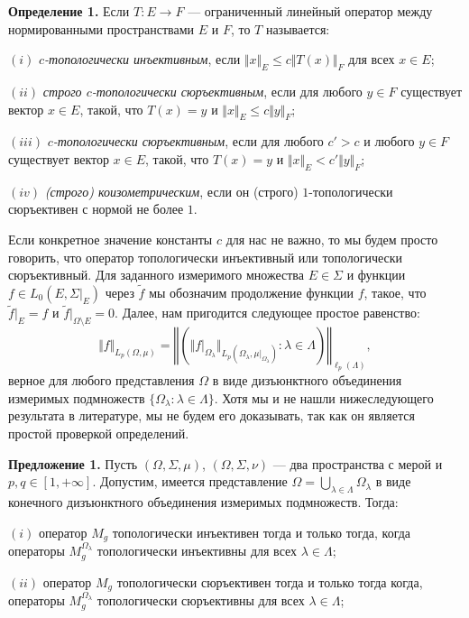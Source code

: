 \documentclass[11pt,twoside]{article}
\begin{document}
\textbf{Определение 1.} Если $ T:E\to F$ --- ограниченный линейный оператор между нормированными пространствами $E$ и $F$, то $ T$ называется:

$(i)$ \textit{$c$-топологически инъективным}, если $\Vert x\Vert_E\leq c\Vert  T(x)\Vert_F$ для всех $x \in E$; 

$(ii)$ \textit{строго $c$-топологически сюръективным}, если для любого $y\in F$ существует вектор $x \in E$, такой, что $ T(x) = y$ и $\Vert x \Vert_E \leq c \Vert y \Vert_F$; 

$(iii)$ \textit{$c$-топологически сюръективным}, если для любого $c'>c$ и любого $y\in F$ существует вектор $x \in E$, такой, что $ T(x) = y$ и $\Vert x \Vert_E < c' \Vert y \Vert_F$; 

$(iv)$ \textit{(строго) коизометрическим}, если он (строго) $1$-топологически сюръективен с нормой не более $1$.


Если конкретное значение константы $c$ для нас не важно, то мы будем просто говорить, что оператор топологически инъективный или топологически сюръективный. 
Для заданного измеримого множества $E\in \Sigma$ и функции $f\in L_0(E,\Sigma|_{E})$ через $\widetilde{f}$ мы обозначим продолжение функции $f$, такое, что $\widetilde{f}|_E=f$ и $\widetilde{f}|_{\Omega\setminus E}=0$. Далее, нам пригодится следующее простое равенство:
$$
\Vert f\Vert_{L_p(\Omega,\mu)}=\left\Vert\left(\Vert f|_{\Omega_\lambda}\Vert_{L_p(\Omega_\lambda,\mu|_{\Omega_\lambda})}:\lambda\in\Lambda\right)\right\Vert_{\ell_p(\Lambda)},
$$
верное для любого представления $\Omega$ в виде дизъюнктного объединения измеримых подмножеств $\{\Omega_\lambda:\lambda\in\Lambda\}$. Хотя мы и не нашли нижеследующего результата в литературе, мы не будем его доказывать, так как он является простой проверкой определений.

\textbf{Предложение 1.} Пусть $(\Omega,\Sigma,\mu)$, $(\Omega,\Sigma,\nu)$ --- два пространства с мерой и $p,q\in[1,+\infty]$. Допустим, имеется представление $\Omega=\bigcup_{\lambda\in\Lambda}\Omega_\lambda$ в виде конечного дизъюнктного объединения измеримых подмножеств. Тогда: 

$(i)$ оператор $M_g$ топологически инъективен тогда и только тогда, когда операторы
$M_g^{\Omega_\lambda}$ топологически инъективны для всех $\lambda\in\Lambda$;

$(ii)$ оператор $M_g$ топологически сюръективен тогда и только тогда когда, операторы 
$M_g^{\Omega_\lambda}$ топологически сюръективны для всех $\lambda\in\Lambda$;
\end{document}
